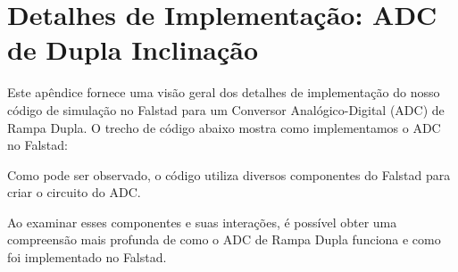 \section*{Detalhes de Implementação: ADC de Dupla Inclinação}
Este apêndice fornece uma visão geral dos detalhes de implementação do nosso código de simulação no Falstad para um Conversor Analógico-Digital (ADC) de Rampa Dupla.
O trecho de código abaixo mostra como implementamos o ADC no Falstad:



Como pode ser observado, o código utiliza diversos componentes do Falstad para criar o circuito do ADC.

Ao examinar esses componentes e suas interações, é possível obter uma compreensão mais profunda de como o ADC de Rampa Dupla funciona e como foi implementado no Falstad.
